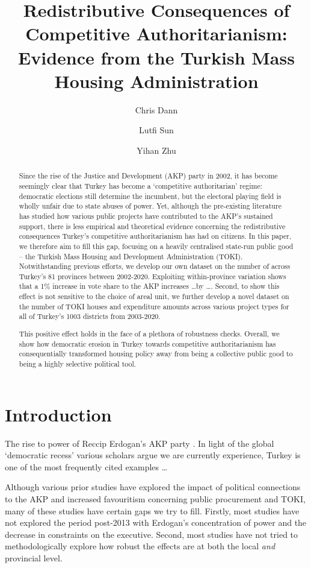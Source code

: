 \documentclass[10pt, oneside]{article}   	%
\title{\textbf{Redistributive Consequences of Competitive Authoritarianism: Evidence from the Turkish Mass Housing Administration}}
\author[1]{Chris Dann}
\author[2]{Lutfi Sun}
\author[3]{Yihan Zhu}
\affil[1]{\small The London School of Economics, London, UK}
\affil[2]{\small University of Texas at Austin, Texas, United States}
\affil[3]{\small University of Oxford, Oxford, UK}
\date{}							%
\numberwithin{equation}{section}
\begin{document}
\maketitle
\begin{abstract}
Since the rise of the Justice and Development (AKP) party in 2002, it has become seemingly clear that Turkey has become a `competitive authoritarian' regime: democratic elections still determine the incumbent, but the electoral playing field is wholly unfair due to state abuses of power. Yet, although the pre-existing literature has studied how various public projects have contributed to the AKP's sustained support, there is less empirical and theoretical evidence concerning the redistributive consequences Turkey's competitive authoritarianism has had on citizens. In this paper, we therefore aim to fill this gap, focusing on a heavily centralised state-run public good -- the Turkish Mass Housing and Development Administration (TOKI). Notwithstanding previous efforts, we develop our own dataset on the number of  across Turkey's 81 provinces between 2002-2020. Exploiting within-province variation shows that a 1\% increase in vote share to the AKP increases \dots by \dots. Second, to show this effect is not sensitive to the choice of areal unit, we further develop a novel dataset on the number of TOKI houses and expenditure amounts across various project types for all of Turkey's 1003 districts from 2003-2020. 

This positive effect holds in the face of a plethora of robustness checks. Overall, we show how democratic erosion in Turkey towards competitive authoritarianism has consequentially transformed housing policy away from being a collective public good to being a highly selective political tool. 

\end{abstract}

\newpage

\section{Introduction}

The rise to power of Reccip Erdogan's AKP party . In light of the global `democratic recess' various scholars argue we are currently experience, Turkey is one of the most frequently cited examples \dots 




Although various prior studies have explored the impact of political connections to the AKP and increased favouritism concerning public procurement and TOKI, many of these studies have certain gaps we try to fill. Firstly, most studies have not explored the period post-2013 with Erdogan's concentration of power and the decrease in constraints on the executive. Second, most studies have not tried to methodologically explore how robust the effects are at both the local \textit{and} provincial level. 
\end{document}
